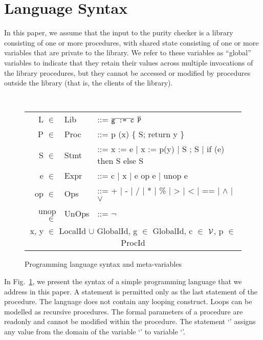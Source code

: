 \newcommand{\elt}{\ensuremath{\in} }
\newcommand{\domain}[1]{#1}

\section{Language Syntax}
\label{sec:background}

In this paper, we assume that the input to the purity checker is a library consisting
of one or more procedures, with shared state consisting of one or more variables
that are private to the library. We refer to these variables as ``global'' variables to
indicate that they retain their values across multiple invocations of the library
procedures, but they cannot be accessed or modified by procedures outside
the library (that is, the clients of the library).

\begin{figure}[t!]
{\tt
\begin{tabular}{rll}
L \elt & \domain{Lib} & ::= $\overline{\texttt{g := c}}$ $\overline{\texttt{P}}$ \\
P \elt & \domain{Proc} & ::= p (x) \{ S; return y \} \\
S \elt & \domain{Stmt} & ::=  x := e | x := p(y) | S ; S | if (e) then S else S \\
e \elt & \domain{Expr} & ::= c | x | e op e | unop e \\
op \elt & \domain{Ops} & ::= + | - | / | * | \% | > | < | == | $\wedge$ | $\vee$ \\
unop \elt & \domain{UnOps} & ::= $\neg$ \\
\multicolumn{3}{c}{
x, y \elt  \domain{LocalId} $\cup$ \domain{GlobalId},
g \elt \domain{GlobalId},
c \elt $\mathcal{V}$,
p \elt \domain{ProcId}
}
\end{tabular}
}
\caption{Programming language syntax and meta-variables}
 \label{fig:grammar}
\end{figure}

In Fig.~\ref{fig:grammar}, we present the syntax of a simple
programming language that we address in this paper.
A  statement is permitted only as the last statement of
the procedure.
The language does not contain any looping construct.
Loops can be modelled as recursive procedures.
The formal parameters of a procedure are readonly and cannot be
modified within the procedure.
The
statement `' assigns any value from the domain of the variable
`' to variable `'.

